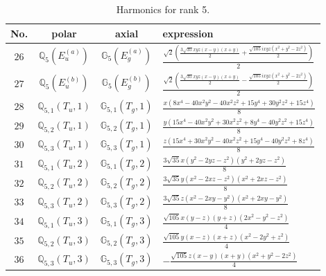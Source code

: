 \documentclass[fleqn,8pt,landscape]{jsarticle}
\begin{document}
\begin{table}[ht!]
\begin{center}
\caption{Harmonics for rank 5.}
\renewcommand{\arraystretch}{1.3}
\begin{tabular}{cccl} \hline \hline
No. & polar & axial & expression \\ \hline
$ 26 $ & $ \mathbb{Q}_{5}(E_{u}^{(a)}) $ & $ \mathbb{G}_{5}(E_{g}^{(a)}) $ & $ \frac{\sqrt{2} \left(\frac{3 \sqrt{35} x y z \left(x - y\right) \left(x + y\right)}{2} + \frac{\sqrt{105} i x y z \left(x^{2} + y^{2} - 2 z^{2}\right)}{2}\right)}{2} $ \\
$ 27 $ & $ \mathbb{Q}_{5}(E_{u}^{(b)}) $ & $ \mathbb{G}_{5}(E_{g}^{(b)}) $ & $ \frac{\sqrt{2} \left(\frac{3 \sqrt{35} x y z \left(x - y\right) \left(x + y\right)}{2} - \frac{\sqrt{105} i x y z \left(x^{2} + y^{2} - 2 z^{2}\right)}{2}\right)}{2} $ \\
$ 28 $ & $ \mathbb{Q}_{5,1}(T_{u},1) $ & $ \mathbb{G}_{5,1}(T_{g},1) $ & $ \frac{x \left(8 x^{4} - 40 x^{2} y^{2} - 40 x^{2} z^{2} + 15 y^{4} + 30 y^{2} z^{2} + 15 z^{4}\right)}{8} $ \\
$ 29 $ & $ \mathbb{Q}_{5,2}(T_{u},1) $ & $ \mathbb{G}_{5,2}(T_{g},1) $ & $ \frac{y \left(15 x^{4} - 40 x^{2} y^{2} + 30 x^{2} z^{2} + 8 y^{4} - 40 y^{2} z^{2} + 15 z^{4}\right)}{8} $ \\
$ 30 $ & $ \mathbb{Q}_{5,3}(T_{u},1) $ & $ \mathbb{G}_{5,3}(T_{g},1) $ & $ \frac{z \left(15 x^{4} + 30 x^{2} y^{2} - 40 x^{2} z^{2} + 15 y^{4} - 40 y^{2} z^{2} + 8 z^{4}\right)}{8} $ \\
$ 31 $ & $ \mathbb{Q}_{5,1}(T_{u},2) $ & $ \mathbb{G}_{5,1}(T_{g},2) $ & $ \frac{3 \sqrt{35} x \left(y^{2} - 2 y z - z^{2}\right) \left(y^{2} + 2 y z - z^{2}\right)}{8} $ \\
$ 32 $ & $ \mathbb{Q}_{5,2}(T_{u},2) $ & $ \mathbb{G}_{5,2}(T_{g},2) $ & $ \frac{3 \sqrt{35} y \left(x^{2} - 2 x z - z^{2}\right) \left(x^{2} + 2 x z - z^{2}\right)}{8} $ \\
$ 33 $ & $ \mathbb{Q}_{5,3}(T_{u},2) $ & $ \mathbb{G}_{5,3}(T_{g},2) $ & $ \frac{3 \sqrt{35} z \left(x^{2} - 2 x y - y^{2}\right) \left(x^{2} + 2 x y - y^{2}\right)}{8} $ \\
$ 34 $ & $ \mathbb{Q}_{5,1}(T_{u},3) $ & $ \mathbb{G}_{5,1}(T_{g},3) $ & $ \frac{\sqrt{105} x \left(y - z\right) \left(y + z\right) \left(2 x^{2} - y^{2} - z^{2}\right)}{4} $ \\
$ 35 $ & $ \mathbb{Q}_{5,2}(T_{u},3) $ & $ \mathbb{G}_{5,2}(T_{g},3) $ & $ \frac{\sqrt{105} y \left(x - z\right) \left(x + z\right) \left(x^{2} - 2 y^{2} + z^{2}\right)}{4} $ \\
$ 36 $ & $ \mathbb{Q}_{5,3}(T_{u},3) $ & $ \mathbb{G}_{5,3}(T_{g},3) $ & $ - \frac{\sqrt{105} z \left(x - y\right) \left(x + y\right) \left(x^{2} + y^{2} - 2 z^{2}\right)}{4} $ \\
 \hline \hline
\end{tabular}
\end{center}
\end{table}
\end{document}
